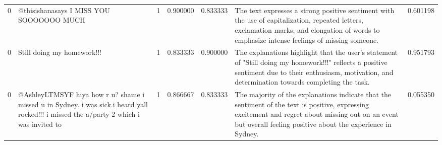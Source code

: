 \begin{tabular}{rlrrrlr}
0 & @thisishanasays I MISS YOU SOOOOOOO MUCH  & 1 & 0.900000 & 0.833333 & The text expresses a strong positive sentiment with the use of capitalization, repeated letters, exclamation marks, and elongation of words to emphasize intense feelings of missing someone. & 0.601198 \\
0 & Still doing my homework!!!  & 1 & 0.833333 & 0.900000 & The explanations highlight that the user's statement of "Still doing my homework!!!" reflects a positive sentiment due to their enthusiasm, motivation, and determination towards completing the task. & 0.951793 \\
0 & @AshleyLTMSYF hiya how r u? shame i missed u in Sydney. i was sick.i heard yall rocked!!! i missed the a/party 2 which i was invited to  & 1 & 0.866667 & 0.833333 & The majority of the explanations indicate that the sentiment of the text is positive, expressing excitement and regret about missing out on an event but overall feeling positive about the experience in Sydney. & 0.055350 \\
\bottomrule
\end{tabular}
